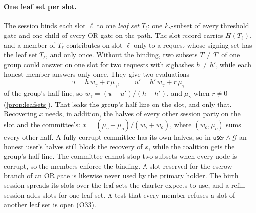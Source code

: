 \paragraph{One leaf set per slot.} The session binds each slot $\ell$ to one \emph{leaf set} $T_\ell$: one $k_\gamma$-subset of every threshold gate and one child of every OR gate on the path. The slot record carries $H(T_\ell)$, and a member of $T_\ell$ contributes on slot $\ell$ only to a request whose signing set has the leaf set $T_\ell$, and only once. Without the binding, two subsets $T \neq T'$ of one group could answer on one slot for two requests with sighashes $h \ne h'$, while each honest member answers only once. They give two evaluations
\[
  u = h\,w_\gamma + r\,\mu_\gamma, \qquad u' = h'\,w_\gamma + r\,\mu_\gamma
\]
of the group's half line, so $w_\gamma = (u - u')/(h - h')$, and $\mu_\gamma$ when $r \ne 0$ (\cref{prop:leafsets}). That leaks the group's half line on the slot, and only that. Recovering $x$ needs, in addition, the halves of every other session party on the slot and the committee's: $x = (\mu_\gamma + \mu_o)/(w_\gamma + w_o)$, where $(w_o, \mu_o)$ sums every other half. A fully corrupt committee has its own halves, so in $\mathsf{user} \wedge \mathcal{G}$ an honest user's halves still block the recovery of $x$, while the coalition gets the group's half line. The committee cannot stop two subsets when every node is corrupt, so the members enforce the binding. A slot reserved for the escrow branch of an OR gate is likewise never used by the primary holder. The birth session spreads its slots over the leaf sets the charter expects to use, and a refill session adds slots for one leaf set. A test that every member refuses a slot of another leaf set is open (O33).


